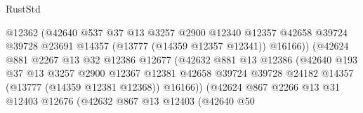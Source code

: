 \begin{lexlean}{RustStd}
\begin{coremodule}
                                      @12362
                                      (@42640
                                        @537
                                        @37
                                        @13
                                        @3257
                                        @2900
                                        @12340
                                        @12357
                                        @42658
                                        @39724
                                        @39728
                                        @23691
                                        @14357
                                        (@13777 (@14359 @12357 @12341))
                                        @16166))
                                    (@42624
                                      @881
                                      @2267
                                      @13
                                      @32
                                      @12386
                                      @12677
                                      (@42632
                                        @881
                                        @13
                                        @12386
                                        (@42640
                                          @193
                                          @37
                                          @13
                                          @3257
                                          @2900
                                          @12367
                                          @12381
                                          @42658
                                          @39724
                                          @39728
                                          @24182
                                          @14357
                                          (@13777 (@14359 @12381 @12368))
                                          @16166))
                                      (@42624
                                        @867
                                        @2266
                                        @13
                                        @31
                                        @12403
                                        @12676
                                        (@42632
                                          @867
                                          @13
                                          @12403
                                          (@42640
                                            @50

\end{coremodule}
\end{lexlean}
